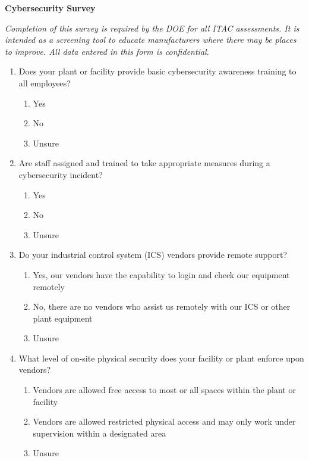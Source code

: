 \documentclass[./main.tex]{subfiles}
\begin{document}
\begin{center}
\Large\textbf{Cybersecurity Survey}
\end{center}

\emph{Completion of this survey is required by the DOE for all ITAC assessments. It is intended as a screening tool to educate manufacturers where there may be places to improve. All data entered in this form is confidential. }

\begin{enumerate}[label=\textbf{Q\arabic*.}]

\item Does your plant or facility provide basic cybersecurity awareness training to all employees?
\begin{enumerate}
    \item Yes
    \item No
    \item Unsure
\end{enumerate}

\item Are staff assigned and trained to take appropriate measures during a cybersecurity incident?
\begin{enumerate}
    \item Yes
    \item No
    \item Unsure
\end{enumerate}

\item Do your industrial control system (ICS) vendors provide remote support?
\begin{enumerate}
    \item Yes, our vendors have the capability to login and check our equipment remotely
    \item No, there are no vendors who assist us remotely with our ICS or other plant equipment
    \item Unsure
\end{enumerate}

\item What level of on-site physical security does your facility or plant enforce upon vendors?
\begin{enumerate}
    \item Vendors are allowed free access to most or all spaces within the plant or facility
    \item Vendors are allowed restricted physical access and may only work under supervision within a designated area
    \item Unsure
\end{enumerate}


\end{enumerate}
\end{document}
